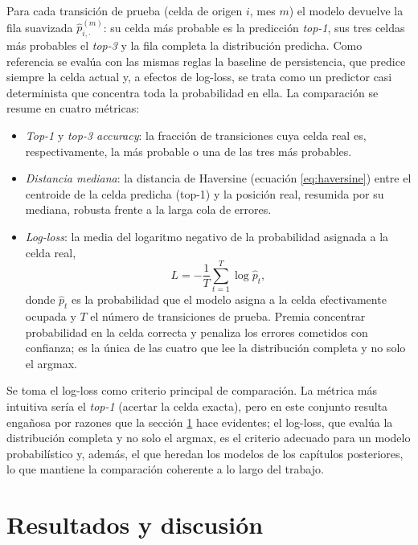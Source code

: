 Para cada transición de prueba (celda de origen $i$, mes $m$) el modelo devuelve la
fila suavizada $\hat{p}^{(m)}_{i,\cdot}$: su celda más probable es la predicción
\emph{top-1}, sus tres celdas más probables el \emph{top-3} y la fila completa la
distribución predicha. Como referencia se evalúa con las mismas reglas la baseline de
persistencia, que predice siempre la celda actual y, a efectos de log-loss, se trata
como un predictor casi determinista que concentra toda la probabilidad en ella. La
comparación se resume en cuatro métricas:

\begin{itemize}
  \item \emph{Top-1} y \emph{top-3 accuracy}: la fracción de transiciones cuya celda
  real es, respectivamente, la más probable o una de las tres más probables.
  \item \emph{Distancia mediana}: la distancia de Haversine (ecuación
  \ref{eq:haversine}) entre el centroide de la celda predicha (top-1) y la posición
  real, resumida por su mediana, robusta frente a la larga cola de errores.
  \item \emph{Log-loss}: la media del logaritmo negativo de la probabilidad asignada a
  la celda real,
  \begin{equation}
    L = -\frac{1}{T} \sum_{t=1}^{T} \log \hat{p}_t,
    \label{eq:o2-logloss}
  \end{equation}
  donde $\hat{p}_t$ es la probabilidad que el modelo asigna a la celda efectivamente
  ocupada y $T$ el número de transiciones de prueba. Premia concentrar probabilidad en
  la celda correcta y penaliza los errores cometidos con confianza; es la única de las
  cuatro que lee la distribución completa y no solo el argmax.
\end{itemize}

Se toma el log-loss como criterio principal de comparación. La métrica más intuitiva
sería el \emph{top-1} (acertar la celda exacta), pero en este conjunto resulta
engañosa por razones que la sección \ref{sec:o2-resultados} hace evidentes; el
log-loss, que evalúa la distribución completa y no solo el argmax, es el criterio
adecuado para un modelo probabilístico y, además, el que heredan los modelos de los
capítulos posteriores, lo que mantiene la comparación coherente a lo largo del
trabajo.

\section{Resultados y discusión}
\label{sec:o2-resultados}

